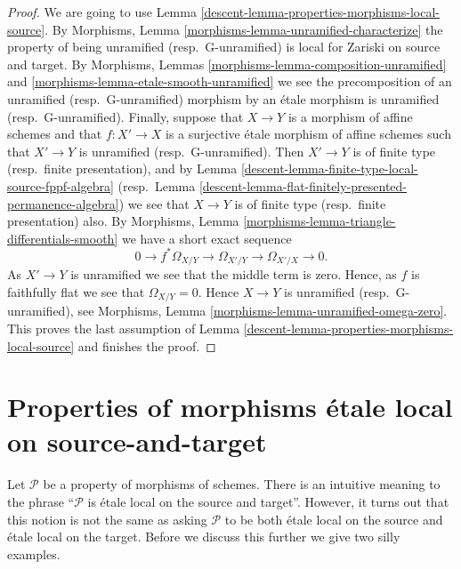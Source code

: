 \begin{proof}

We are going to use
Lemma \ref{descent-lemma-properties-morphisms-local-source}.
By
Morphisms, Lemma \ref{morphisms-lemma-unramified-characterize}
the property of being unramified (resp.\ G-unramified)
is local for Zariski on source and target. By
Morphisms, Lemmas \ref{morphisms-lemma-composition-unramified} and
\ref{morphisms-lemma-etale-smooth-unramified}
we see the precomposition
of an unramified (resp.\ G-unramified) morphism by an \'etale morphism is
unramified (resp.\ G-unramified).
Finally, suppose that $X \to Y$ is a morphism of affine schemes
and that $f : X' \to X$ is a surjective \'etale morphism of affine schemes
such that $X' \to Y$ is unramified (resp.\ G-unramified).
Then $X' \to Y$ is of finite type (resp.\ finite presentation), and by
Lemma \ref{descent-lemma-finite-type-local-source-fppf-algebra}
(resp.\ Lemma \ref{descent-lemma-flat-finitely-presented-permanence-algebra})
we see that $X \to Y$ is of finite type (resp.\ finite presentation) also. By
Morphisms, Lemma \ref{morphisms-lemma-triangle-differentials-smooth}
we have a short exact sequence
$$
0 \to f^*\Omega_{X/Y} \to \Omega_{X'/Y} \to \Omega_{X'/X} \to 0.
$$
As $X' \to Y$ is unramified we see that the middle term is zero.
Hence, as $f$ is faithfully flat we see that $\Omega_{X/Y} = 0$.
Hence $X \to Y$ is unramified (resp.\ G-unramified), see
Morphisms, Lemma \ref{morphisms-lemma-unramified-omega-zero}.
This proves the last assumption of
Lemma \ref{descent-lemma-properties-morphisms-local-source}
and finishes the proof.
\end{proof}

\section{Properties of morphisms \'etale local on source-and-target}
\label{descent-section-properties-etale-local-source-target}
Let $\mathcal{P}$ be a property of morphisms of schemes. There is an
intuitive meaning to the phrase ``$\mathcal{P}$ is \'etale local on the
source and target''. However, it turns out that this notion is not
the same as asking $\mathcal{P}$ to be both \'etale
local on the source and \'etale local on the target.
Before we discuss this further we give two silly examples.

